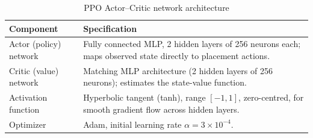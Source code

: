 \documentclass[11pt,a4paper,oneside]{report}
\begin{document}
\begin{table}[H]
\centering
\caption{PPO Actor--Critic network architecture}
\label{tab:ppo_arch}
\begin{tabular}{|p{3.6cm}|p{9.6cm}|}
\hline
\textbf{Component} & \textbf{Specification} \\
\hline
Actor (policy) network & Fully connected MLP, 2 hidden layers of 256 neurons each; maps observed state directly to placement actions. \\ \hline
Critic (value) network & Matching MLP architecture (2 hidden layers of 256 neurons); estimates the state-value function. \\ \hline
Activation function & Hyperbolic tangent (tanh), range $[-1, 1]$, zero-centred, for smooth gradient flow across hidden layers. \\ \hline
Optimizer & Adam, initial learning rate $\alpha = 3 \times 10^{-4}$. \\
\hline
\end{tabular}
\end{table}
\end{document}

